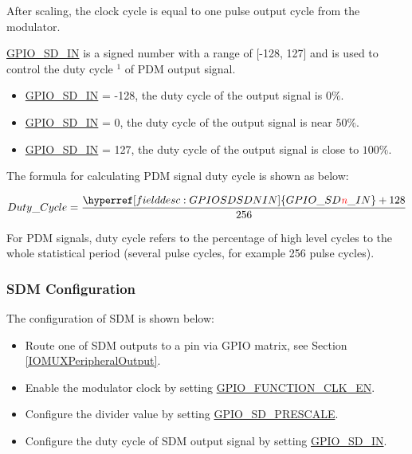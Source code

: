 \documentclass[main\_\_EN.tex]{subfiles}
\begin{document}
After scaling, the clock cycle is equal to one pulse output cycle from the modulator.

\hyperref[fielddesc:GPIOSDSDNIN]{GPIO\_SD\_IN} is a signed number with a range of [-128, 127] and is used to control the duty cycle $^{1}$ of PDM output signal.

\begin{itemize}
    \item \hyperref[fielddesc:GPIOSDSDNIN]{GPIO\_SD\_IN} = -128, the duty cycle of the output signal is \begin{math}0\% \end{math}.
    \item \hyperref[fielddesc:GPIOSDSDNIN]{GPIO\_SD\_IN} = 0, the duty cycle of the output signal is near \begin{math}50\% \end{math}.
    \item \hyperref[fielddesc:GPIOSDSDNIN]{GPIO\_SD\_IN} = 127, the duty cycle of the output signal is close to \begin{math}100\% \end{math}.
\end{itemize}

The formula for calculating PDM signal duty cycle is shown as below:

    \[
    Duty\_Cycle=\frac{\hyperref[fielddesc:GPIOSDSDNIN]{GPIO\_SD\regindex{n}\_IN} + 128} {256}
    \]

\begin{tiplisting}
For PDM signals, duty cycle refers to the percentage of high level cycles to the whole statistical period (several pulse cycles, for example 256 pulse cycles).
\end{tiplisting}

\subsubsection{SDM Configuration}

The configuration of SDM is shown below:

\begin{itemize}
    \item Route one of SDM outputs to a pin via GPIO matrix, see Section \ref{IOMUXPeripheralOutput}.
    \item Enable the modulator clock by setting \hyperref[fielddesc:GPIOSDFUNCTIONCLKEN]{GPIO\_FUNCTION\_CLK\_EN}.
    \item Configure the divider value by setting \hyperref[fielddesc:GPIOSDSDNPRESCALE]{GPIO\_SD\_PRESCALE}.
    \item Configure the duty cycle of SDM output signal by setting \hyperref[fielddesc:GPIOSDSDNIN]{GPIO\_SD\_IN}.
\end{itemize}
\end{document}
